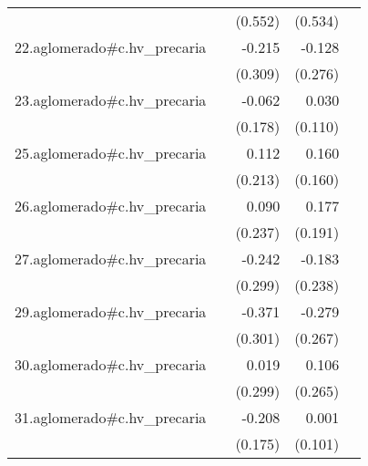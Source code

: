 {\begin{longtable}{l*{4}{D{.}{.}{-1}}}
            &                     &     (0.552)         &     (0.534)         &                     \\
\addlinespace
22.aglomerado#c.hv\_precaria&                     &      -0.215         &      -0.128         &                     \\
            &                     &     (0.309)         &     (0.276)         &                     \\
\addlinespace
23.aglomerado#c.hv\_precaria&                     &      -0.062         &       0.030         &                     \\
            &                     &     (0.178)         &     (0.110)         &                     \\
\addlinespace
25.aglomerado#c.hv\_precaria&                     &       0.112         &       0.160         &                     \\
            &                     &     (0.213)         &     (0.160)         &                     \\
\addlinespace
26.aglomerado#c.hv\_precaria&                     &       0.090         &       0.177         &                     \\
            &                     &     (0.237)         &     (0.191)         &                     \\
\addlinespace
27.aglomerado#c.hv\_precaria&                     &      -0.242         &      -0.183         &                     \\
            &                     &     (0.299)         &     (0.238)         &                     \\
\addlinespace
29.aglomerado#c.hv\_precaria&                     &      -0.371         &      -0.279         &                     \\
            &                     &     (0.301)         &     (0.267)         &                     \\
\addlinespace
30.aglomerado#c.hv\_precaria&                     &       0.019         &       0.106         &                     \\
            &                     &     (0.299)         &     (0.265)         &                     \\
\addlinespace
31.aglomerado#c.hv\_precaria&                     &      -0.208         &       0.001         &                     \\
            &                     &     (0.175)         &     (0.101)         &                     \\

\end{longtable}}
